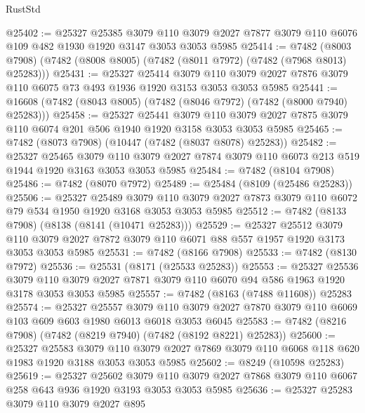 \begin{lexlean}{RustStd}
\begin{coremodule}
{\begin{coremodule}
{{{{{{{{{{{{{{{{{{{{{{{{{{{{{{{{@25402 := @25327
    @25385
    @3079
    @110
    @3079
    @2027
    @7877
    @3079
    @110
    @6076
    @109
    @482
    @1930
    @1920
    @3147
    @3053
    @3053
    @5985
@25414 := @7482
    (@8003 @7908)
    (@7482 (@8008 @8005) (@7482 (@8011 @7972) (@7482 (@7968 @8013) @25283)))
@25431 := @25327
    @25414
    @3079
    @110
    @3079
    @2027
    @7876
    @3079
    @110
    @6075
    @73
    @493
    @1936
    @1920
    @3153
    @3053
    @3053
    @5985
@25441 := @16608 (@7482 (@8043 @8005) (@7482 (@8046 @7972) (@7482 (@8000 @7940) @25283)))
@25458 := @25327
    @25441
    @3079
    @110
    @3079
    @2027
    @7875
    @3079
    @110
    @6074
    @201
    @506
    @1940
    @1920
    @3158
    @3053
    @3053
    @5985
@25465 := @7482 (@8073 @7908) (@10447 (@7482 (@8037 @8078) @25283))
@25482 := @25327
    @25465
    @3079
    @110
    @3079
    @2027
    @7874
    @3079
    @110
    @6073
    @213
    @519
    @1944
    @1920
    @3163
    @3053
    @3053
    @5985
@25484 := @7482 (@8104 @7908)
@25486 := @7482 (@8070 @7972)
@25489 := @25484 (@8109 (@25486 @25283))
@25506 := @25327
    @25489
    @3079
    @110
    @3079
    @2027
    @7873
    @3079
    @110
    @6072
    @79
    @534
    @1950
    @1920
    @3168
    @3053
    @3053
    @5985
@25512 := @7482 (@8133 @7908) (@8138 (@8141 (@10471 @25283)))
@25529 := @25327
    @25512
    @3079
    @110
    @3079
    @2027
    @7872
    @3079
    @110
    @6071
    @88
    @557
    @1957
    @1920
    @3173
    @3053
    @3053
    @5985
@25531 := @7482 (@8166 @7908)
@25533 := @7482 (@8130 @7972)
@25536 := @25531 (@8171 (@25533 @25283))
@25553 := @25327
    @25536
    @3079
    @110
    @3079
    @2027
    @7871
    @3079
    @110
    @6070
    @94
    @586
    @1963
    @1920
    @3178
    @3053
    @3053
    @5985
@25557 := @7482 (@8163 (@7488 @11608)) @25283
@25574 := @25327
    @25557
    @3079
    @110
    @3079
    @2027
    @7870
    @3079
    @110
    @6069
    @103
    @609
    @603
    @1980
    @6013
    @6018
    @3053
    @6045
@25583 := @7482 (@8216 @7908) (@7482 (@8219 @7940) (@7482 (@8192 @8221) @25283))
@25600 := @25327
    @25583
    @3079
    @110
    @3079
    @2027
    @7869
    @3079
    @110
    @6068
    @118
    @620
    @1983
    @1920
    @3188
    @3053
    @3053
    @5985
@25602 := @8249 (@10598 @25283)
@25619 := @25327
    @25602
    @3079
    @110
    @3079
    @2027
    @7868
    @3079
    @110
    @6067
    @258
    @643
    @936
    @1920
    @3193
    @3053
    @3053
    @5985
@25636 := @25327
    @25283
    @3079
    @110
    @3079
    @2027
    @895
}}}}}}}}}}}}}}}}}}}}}}}}}}}}}}}}
\end{coremodule}}
\end{coremodule}
\end{lexlean}
